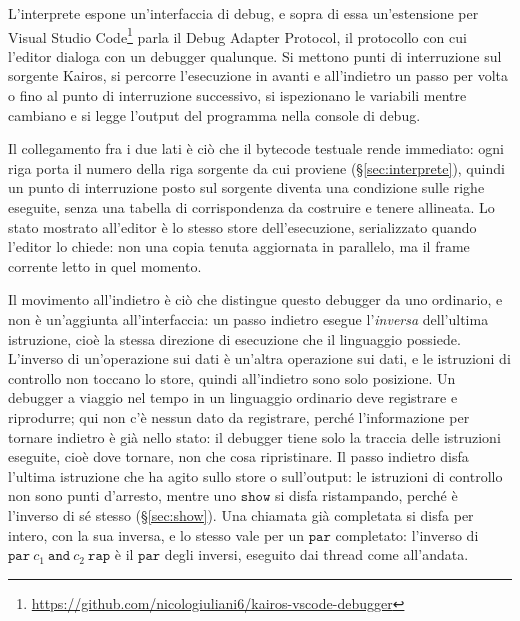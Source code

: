 L'interprete espone un'interfaccia di debug, e sopra di essa un'estensione per
Visual Studio Code\footnote{\url{https://github.com/nicologiuliani6/kairos-vscode-debugger}}
parla il Debug Adapter Protocol, il protocollo con cui l'editor dialoga con un
debugger qualunque. Si mettono punti di interruzione sul sorgente Kairos, si
percorre l'esecuzione in avanti e all'indietro un passo per volta o fino al
punto di interruzione successivo, si ispezionano le variabili mentre cambiano e
si legge l'output del programma nella console di debug.

Il collegamento fra i due lati è ciò che il bytecode testuale rende immediato:
ogni riga porta il numero della riga sorgente da cui proviene
(\S\ref{sec:interprete}), quindi un punto di interruzione posto sul sorgente
diventa una condizione sulle righe eseguite, senza una tabella di corrispondenza
da costruire e tenere allineata. Lo stato mostrato all'editor è lo stesso store
dell'esecuzione, serializzato quando l'editor lo chiede: non una copia tenuta
aggiornata in parallelo, ma il frame corrente letto in quel momento.

\medskip
\noindent
Il movimento all'indietro è ciò che distingue questo debugger da uno ordinario,
e non è un'aggiunta all'interfaccia: un passo indietro esegue l'\emph{inversa}
dell'ultima istruzione, cioè la stessa direzione di esecuzione che il linguaggio
possiede. L'inverso di un'operazione sui dati è un'altra operazione sui dati, e
le istruzioni di controllo non toccano lo store, quindi all'indietro sono solo
posizione. Un debugger a viaggio nel tempo in un linguaggio ordinario deve
registrare e riprodurre; qui non c'è nessun dato da registrare, perché
l'informazione per tornare indietro è già nello stato: il debugger tiene solo la
traccia delle istruzioni eseguite, cioè dove tornare, non che cosa ripristinare.
Il passo indietro disfa l'ultima istruzione che ha agito sullo store o
sull'output: le istruzioni di controllo non sono punti d'arresto, mentre uno
$\mathtt{show}$ si disfa ristampando, perché è l'inverso di sé stesso
(\S\ref{sec:show}). Una chiamata già completata si disfa per intero, con la sua
inversa, e lo stesso vale per un $\mathtt{par}$ completato: l'inverso di
$\mathtt{par}\ c_1\ \mathtt{and}\ c_2\ \mathtt{rap}$ è il $\mathtt{par}$ degli
inversi, eseguito dai thread come all'andata.

